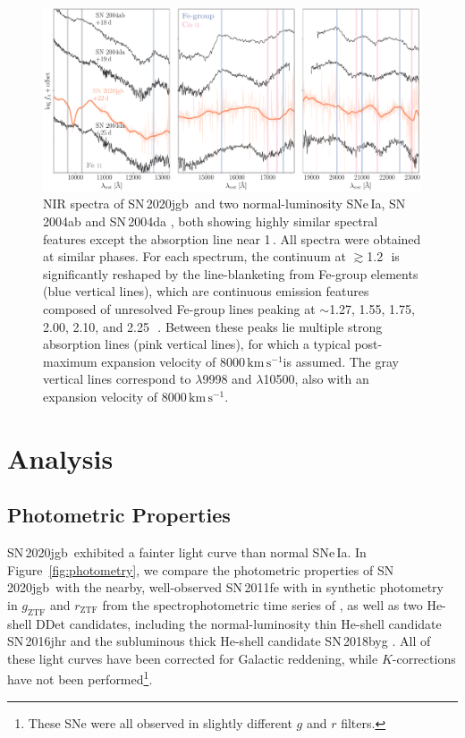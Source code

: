 \documentclass[twocolumn]{aastex631}
\newcommand{\sn}{SN\,2020jgb}
\newcommand{\kms}{$\mathrm{km}\,\mathrm{s}^{-1}$}
\begin{document}
\begin{figure}
    \centering
    \includegraphics[width=\textwidth]{NIR_spec.pdf}
    \caption{NIR spectra of \sn\ and two normal-luminosity SNe\,Ia, SN\,2004ab and SN\,2004da \citep{Marion2009_NIR}, both showing highly similar spectral features except the absorption line near 1\,\micron. All spectra were obtained at similar phases. For each spectrum, the continuum at $\gtrsim$1.2\,\micron\ is significantly reshaped by the line-blanketing from Fe-group elements (blue vertical lines), which are continuous emission features composed of unresolved Fe-group lines peaking at $\sim$1.27, 1.55, 1.75, 2.00, 2.10, and 2.25\,\micron\ \citep{Marion2009_NIR}. Between these peaks lie multiple strong  absorption lines (pink vertical lines), for which a typical post-maximum expansion velocity of 8000\,\kms is assumed. The gray vertical lines correspond to  $\lambda$9998 and  $\lambda$10500, also with an expansion velocity of 8000\,\kms.}
    \label{fig:NIR_spec}
\end{figure}

\section{Analysis} \label{sec:analysis}
\subsection{Photometric Properties}
\sn\ exhibited a fainter light curve than normal SNe\,Ia. In Figure~\ref{fig:photometry}, we compare the photometric properties of \sn\ with the nearby, well-observed SN\,2011fe with in synthetic photometry in $g_\mathrm{ZTF}$ and $r_\mathrm{ZTF}$ from the spectrophotometric time series of \citet{Pereira_2013}, as well as two He-shell DDet candidates, including the normal-luminosity thin He-shell candidate SN\,2016jhr \citep{jiang_16jhr_2017} and the subluminous thick He-shell candidate SN\,2018byg \citep{de_18byg_2019}. All of these light curves have been corrected for Galactic reddening, while $K$-corrections have not been performed\footnote{These SNe were all observed in slightly different $g$ and $r$ filters.}.
\end{document}
